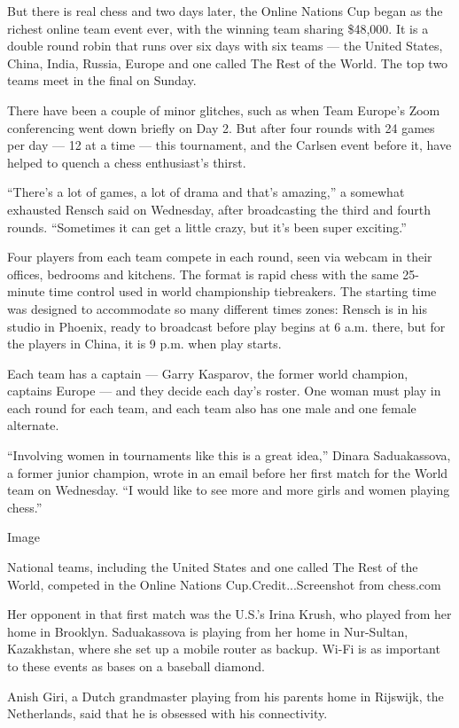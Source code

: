 But there is real chess and two days later, the Online Nations Cup began
as the richest online team event ever, with the winning team sharing
\$48,000. It is a double round robin that runs over six days with six
teams --- the United States, China, India, Russia, Europe and one called
The Rest of the World. The top two teams meet in the final on Sunday.

There have been a couple of minor glitches, such as when Team Europe's
Zoom conferencing went down briefly on Day 2. But after four rounds with
24 games per day --- 12 at a time --- this tournament, and the Carlsen
event before it, have helped to quench a chess enthusiast's thirst.

``There's a lot of games, a lot of drama and that's amazing,'' a
somewhat exhausted Rensch said on Wednesday, after broadcasting the
third and fourth rounds. ``Sometimes it can get a little crazy, but it's
been super exciting.''

Four players from each team compete in each round, seen via webcam in
their offices, bedrooms and kitchens. The format is rapid chess with the
same 25-minute time control used in world championship tiebreakers. The
starting time was designed to accommodate so many different times zones:
Rensch is in his studio in Phoenix, ready to broadcast before play
begins at 6 a.m. there, but for the players in China, it is 9 p.m. when
play starts.

Each team has a captain --- Garry Kasparov, the former world champion,
captains Europe --- and they decide each day's roster. One woman must
play in each round for each team, and each team also has one male and
one female alternate.

``Involving women in tournaments like this is a great idea,'' Dinara
Saduakassova, a former junior champion, wrote in an email before her
first match for the World team on Wednesday. ``I would like to see more
and more girls and women playing chess.''

Image

National teams, including the United States and one called The Rest of
the World, competed in the Online Nations Cup.Credit...Screenshot from
chess.com

Her opponent in that first match was the U.S.'s Irina Krush, who played
from her home in Brooklyn. Saduakassova is playing from her home in
Nur-Sultan, Kazakhstan, where she set up a mobile router as backup.
Wi-Fi is as important to these events as bases on a baseball diamond.

Anish Giri, a Dutch grandmaster playing from his parents home in
Rijswijk, the Netherlands, said that he is obsessed with his
connectivity.

